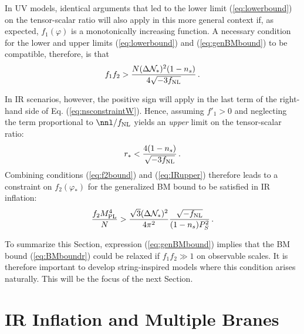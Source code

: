 In UV models, identical arguments that led to 
the lower limit (\ref{eq:lowerbound}) on the tensor-scalar ratio
will also apply in this more general context if, as expected, $f_1 (\varphi) $ 
is a monotonically increasing function. A necessary condition for
the lower and upper limits
(\ref{eq:lowerbound}) and (\ref{eq:genBMbound}) to be compatible, therefore, is  
that  
% 
\begin{equation}
\label{eq:evade}
f_1f_2 > \frac{N (\Delta {\cal{N}}_*)^2 (1-n_s)}{4\sqrt{-3f_{\mathrm{NL}}}} \,.
\end{equation}
% 


In IR scenarios, however, the positive sign will apply in the 
last term of the right-hand side of Eq. (\ref{eq:nsconstraintW}).
Hence, assuming $f'_1 >0$ and neglecting the term proportional to 
$\nnl/\fnl$ yields an {\em upper} limit on the tensor-scalar ratio:
% 
\begin{equation}
\label{eq:IRupper}
r_* < \frac{4(1-n_s)}{\sqrt{-3f_{\mathrm{NL}}}}  \,.
\end{equation}
% 
Combining conditions (\ref{eq:f2bound}) and (\ref{eq:IRupper}) 
therefore leads to a constraint on $f_2 (\varphi_*) $
for the generalized BM bound to be satisfied in IR inflation: 
% 
\begin{equation}
\label{eq:f2IRlower}
\frac{f_2M_{\mathrm{PL}}^4}{N} > \frac{\sqrt{3} (\Delta {\cal{N}}_*)^2}{4\pi^2}
\frac{\sqrt{-f_{\mathrm{NL}}}}{(1-n_s)P_S^2}  \,.
\end{equation}
% 


To summarize this Section, 
expression (\ref{eq:genBMbound}) implies that the 
BM bound (\ref{eq:BMboundr}) 
could be relaxed if $f_1f_2 \gg 1$ on observable scales. 
It is therefore important to develop string-inspired models 
where this condition arises naturally. This will be the focus of the 
next Section.
% 
% 
% 
% 
\section{IR Inflation and Multiple Branes}
\label{sec:multiple-dbi}


